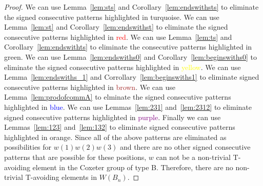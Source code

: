 \begin{proof}
We can use Lemma~\ref{lem:sts} and Corollary~\ref{lem:endswithsts} to eliminate the signed consecutive patterns highlighted in \textcolor{turq}{turquoise}. We can use Lemma~\ref{lem:st} and Corollary~\ref{lem:endswithst} to eliminate the signed consecutive patterns highlighted in \textcolor{red}{red}. We can use Lemma~\ref{lem:ts} and Corollary~\ref{lem:endswithts} to eliminate the consecutive patterns highlighted in \textcolor{ggreen}{green}.  We can use Lemma~\ref{lem:endswiths0} and Corollary~\ref{lem:beginswiths0} to eliminate the signed consecutive patterns highlighted in \textcolor{yellow}{yellow}. We can use Lemma~\ref{lem:endswiths_1} and Corrollary~\ref{lem:beginswiths1} to eliminate signed consecutive patterns highlighted in \textcolor{brown}{brown}. We can use Lemma~\ref{lem:prodofcommA} to elminate the signed consecutive patterns highlighted in \textcolor{blue}{blue}. We can use Lemmas~\ref{lem:231} and~\ref{lem:2312} to eliminate signed consecutive patterns highlighted in \textcolor{purple}{purple}. Finally we can use Lemmas~\ref{lem:123} and~\ref{lem:132} to eliminate signed consecutive patterns highlighted in \textcolor{orange2}{orange}. Since all of the above patterns are eliminated as possibilities for $w(1)w(2)w(3)$ and there are no other signed consecutive patterns that are possible for these positions, $w$ can not be a non-trivial T-avoiding element in the Coxeter group of type B. Therefore, there are no non-trivial T-avoiding elements in $W(B_n)$.
\end{proof}
